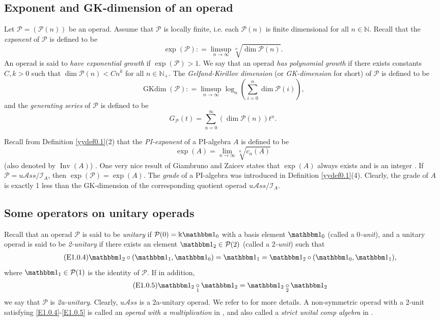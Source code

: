 \documentclass{amsart}
\theoremstyle{definition}
\theoremstyle{remark}
\numberwithin{equation}{section}
\def\N{\mathbb{N}}
\newcommand{\ucr}[1]{\underset{#1}{\circ}}
\def \uas{u\mathcal{A}ss}
\def \I{\mathcal{I}}
\def \ip{{\mathcal{P}}}
\def \dim{\operatorname{dim}}
\def \Inv{\operatorname{Inv}}
\def\gkdim{\operatorname{GKdim}}
\def \1{\mathbbm 1}
\def \N{\mathbb{N}}
\begin{document}
\subsection{Exponent and GK-dimension of an operad}
\label{yysec1.3}
Let $\ip=(\ip(n))$ be an operad. Assume that $\ip$ is 
locally finite,  i.e. each $\ip(n)$ is finite dimensional 
for all $n\in \N$. Recall that the \textit{exponent} of 
$\ip$ is defined to be 
\[\exp(\ip)\colon =\limsup_{n\to \infty} \sqrt[n]{\dim \ip(n)}.\]
An operad is said to \textit{have exponential growth} if 
$\exp(\ip)>1$. We say that an operad \textit{has polynomial 
growth} if there exists constants $C, k>0$ such that $\dim 
\ip(n)<Cn^k$ for all $n\in \N_+$. The \textit{Gelfand-Kirillov 
dimension} (or \textit{GK-dimension} for short) of $\ip$ is 
defined to be 
\[\gkdim(\ip)\colon=\limsup_{n\to \infty} 
\log_n(\sum_{i=0}^n \dim \ip(i)),\]
and the \textit{generating series} of $\ip$ is defined to be 
\[G_\ip(t)=\sum_{n=0}^\infty (\dim\ip(n))t^n.\]

Recall from Definition \ref{yydef0.1}(2) that the 
\textit{PI-exponent} of a PI-algebra $A$ is defined to be
\begin{equation}
\label{E1.0.3}\tag{E1.0.3}
\exp(A)=\lim_{n\to \infty}\sqrt[n]{c_n(A)}
\end{equation}
(also denoted by $\Inv(A)$) \cite[Definition, p.222]{GZ3}. 
One very nice result of Giambruno and Zaicev states that 
$\exp(A)$ always exists and is an integer \cite[Theorem 1]{GZ3}. 
If $\ip=\uas/\I_A$, then $\exp(\ip)=\exp(A)$. The 
\textit{grade} of a PI-algebra was introduced in 
Definition \ref{yydef0.1}(4). Clearly, the grade of $A$ is 
exactly 1 less than the GK-dimension of the corresponding 
quotient operad $\uas/\I_A$. 

\subsection{Some operators on unitary operads}
\label{yysec1.4}
Recall that an operad $\ip$ is said to be \textit{unitary} 
if $\ip(0)=\Bbbk \1_0$ with a basis element $\1_0$ (called a 
\textit{$0$-unit}), and a unitary operad is said to be 
\textit{2-unitary} if there exists an element $\1_2\in \ip(2)$ 
(called a \textit{$2$-unit}) such that 
\begin{align}
\label{E1.0.4}\tag{E1.0.4}
\1_2\circ(\1_1, \1_0)=\1_1=\1_2\circ(\1_0, \1_1),%
\end{align}
where $\1_1\in \ip(1)$ is the identity of $\ip$. If in addition, 
\begin{align}
\label{E1.0.5}\tag{E1.0.5}
\1_2\ucr{1}\1_2=\1_2 \ucr{2}\1_2
\end{align} we say that $\ip$ is \textit{2a-unitary}. 
Clearly, $\uas$ is a 2a-unitary operad. We refer to 
\cite[Section 2.3]{BYZ} for more details. A non-symmetric 
operad with a 2-unit satisfying \eqref{E1.0.4}-\eqref{E1.0.5}
is called an \textit{operad with a multiplication} in 
\cite{Me, Ko}, and also called a \textit{strict unital comp 
algebra} in \cite{GS}.
\end{document}
